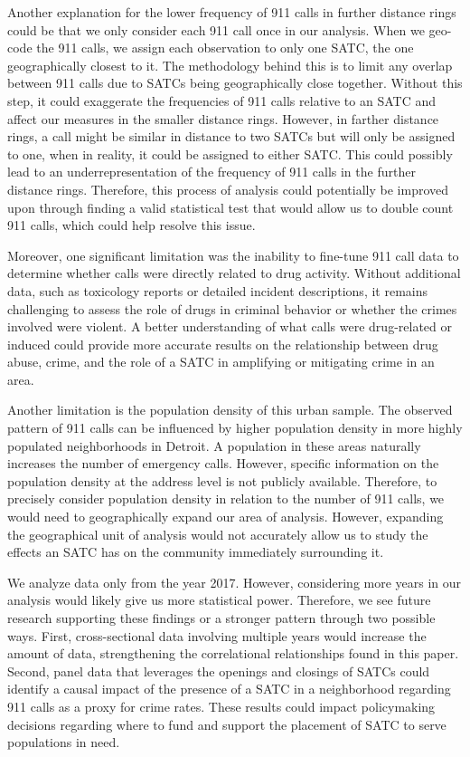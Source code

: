\documentclass[12pt]{article}
\begin{document}
Another explanation for the lower frequency of 911 calls in further distance rings could be that we only consider each 911 call once in our analysis. When we geo-code the 911 calls, we assign each observation to only one SATC, the one geographically closest to it. The methodology behind this is to limit any overlap between 911 calls due to SATCs being geographically close together. Without this step, it could exaggerate the frequencies of 911 calls relative to an SATC and affect our measures in the smaller distance rings.  However, in farther distance rings, a call might be similar in distance to two SATCs but will only be assigned to one, when in reality, it could be assigned to either SATC. This could possibly lead to an underrepresentation of the frequency of 911 calls in the further distance rings. Therefore, this process of analysis could potentially be improved upon through finding a valid statistical test that would allow us to double count 911 calls, which could help resolve this issue. 

Moreover, one significant limitation was the inability to fine-tune 911 call data to determine whether calls were directly related to drug activity. Without additional data, such as toxicology reports or detailed incident descriptions, it remains challenging to assess the role of drugs in criminal behavior or whether the crimes involved were violent. A better understanding of what calls were drug-related or induced could provide more accurate results on the relationship between drug abuse, crime, and the role of a SATC in amplifying or mitigating crime in an area. 
    
Another limitation is the population density of this urban sample. The observed pattern of 911 calls can be influenced by higher population density in more highly populated neighborhoods in Detroit. A population in these areas naturally increases the number of emergency calls. However, specific information on the population density at the address level is not publicly available. Therefore, to precisely consider population density in relation to the number of 911 calls, we would need to geographically expand our area of analysis. However, expanding the geographical unit of analysis would not accurately allow us to study the effects an SATC has on the community immediately surrounding it. 

We analyze data only from the year 2017. However, considering more years in our analysis would likely give us more statistical power. Therefore, we see future research supporting these findings or a stronger pattern through two possible ways. First, cross-sectional data involving multiple years would increase the amount of data, strengthening the correlational relationships found in this paper. Second, panel data that leverages the openings and closings of SATCs could identify a causal impact of the presence of a SATC in a neighborhood regarding 911 calls as a proxy for crime rates. These results could impact policymaking decisions regarding where to fund and support the placement of SATC to serve populations in need. 
\end{document}
